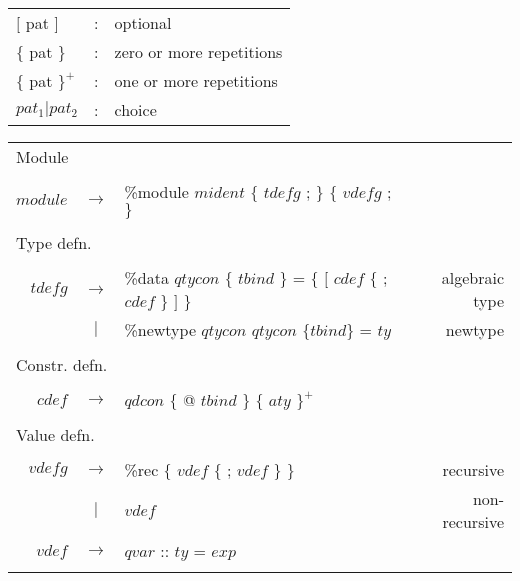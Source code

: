 \begin{longtable}{ l c l }

$[$ pat $]$		& :	& optional			\\
$\{$ pat $\}$		& :	& zero or more repetitions	\\
$\{$ pat $\}^{+}$	& :	& one or more repetitions	\\
$pat_{1}|pat_{2}$	& :	& choice			\\

\end{longtable}

\begin{scriptsize}
\begin{longtable}{ r c l r }


\\[0.01in]

\multicolumn{4}{l}{Module}			 \\
\\[0.01in]
$module$	& $ \rightarrow $ 	& \%module $mident$ $\{$ $tdefg$ ; $\}$ $\{$ $vdefg$ ; $\}$				&			\\
\\[0.01in]

\multicolumn{4}{l}{Type defn.}			 \\
\\[0.01in]
$tdefg$ 	& $ \rightarrow $	& \%data $qtycon$ $\{$ $tbind$ $\}$  = $\{$ $[$ $cdef$ $\{$ ; $cdef$ $\}$ $]$ $\}$	& algebraic type	\\
		& $ | $			& \%newtype $qtycon$ $qtycon$ $\{ tbind \}$ = $ty$					& newtype		\\
\\[0.01in]

\multicolumn{4}{l}{Constr. defn.}			 \\
\\[0.01in]
$cdef$		& $ \rightarrow $	& $qdcon$ $\{$ @ $tbind$ $\}$ $\{$ $aty$ $\}^{+}$ 					& 			\\
\\[0.01in]

\multicolumn{4}{l}{Value defn.}			 \\
\\[0.01in]
$vdefg$		& $ \rightarrow $	& \%rec $\{$ $vdef$ $\{$ ; $vdef$ $\}$ $\}$						& recursive		\\
		& $ | $			& $vdef$										& non-recursive		\\
$vdef$ 		& $ \rightarrow $	& $qvar$ :: $ty$ = $exp$								& 			\\
\\[0.01in]


\end{longtable}
\end{scriptsize}
